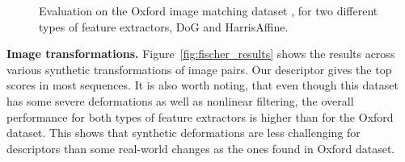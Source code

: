 \begin{figure}
\centering    
{}
\caption{Evaluation on the Oxford image matching dataset
  \cite{schmid2003performance}, for two different types of feature
  extractors, DoG and  HarrisAffine.}
\label{fig:oxford_results}
\vspace{-0.2cm}
\end{figure}

\textbf{Image transformations.} Figure~\ref{fig:fischer_results} shows the results across various synthetic transformations of image pairs. Our descriptor gives the  top scores in most sequences. It is also worth noting, that even though this dataset has some severe deformations as well as nonlinear filtering, the overall performance for both types of feature extractors is higher than for the Oxford dataset. This shows that synthetic deformations are less challenging for descriptors than some real-world changes as the ones found in Oxford dataset.

